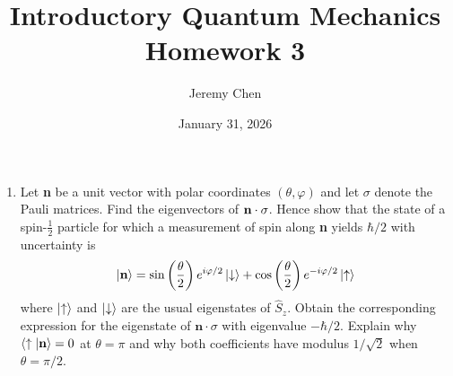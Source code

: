 \documentclass[10pt,letterpaper]{article}
\title{Introductory Quantum Mechanics Homework 3}
\author{Jeremy Chen}
\date{January 31, 2026}
\begin{document}
	\maketitle

\begin{enumerate}

\item Let \textbf{n} be a unit vector with polar coordinates $(\theta, \varphi)$ and let $\sigma$ denote the Pauli matrices. Find the eigenvectors of $\text{\textbf{n}} \cdot \sigma$. Hence show that the state of a spin-$\frac{1}{2}$ particle for which a measurement of spin along \textbf{n} yields $\hbar/2$ with uncertainty is 
$$\ket{\textbf{n}} = \sin\left( \frac{\theta}{2} \right) e^{i\varphi/2}\ket{\downarrow} + \cos\left( \frac{\theta}{2} \right)e^{-i\varphi/2}\ket{\uparrow}$$
where $\ket{\uparrow}$ and $\ket{\downarrow}$ are the usual eigenstates of $\hat{S}_{z}$. Obtain the corresponding expression for the eigenstate of $\textbf{n} \cdot \sigma$ with eigenvalue $-\hbar/2$. Explain why $\braket{\uparrow | \textbf{n}} = 0$ at $\theta = \pi$ and why both coefficients have modulus $1/\sqrt{2}$ when $\theta = \pi/2$.  


\end{enumerate}
\end{document}
